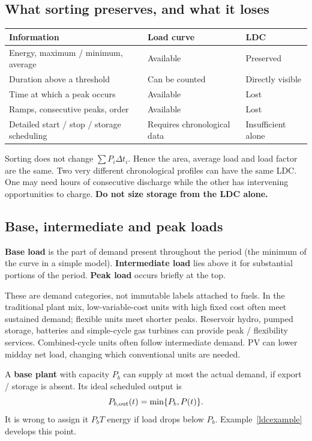 \documentclass[11pt,a4paper]{article}
\begin{document}
\subsection{What sorting preserves, and what it loses}
\begin{center}\small
\begin{tabularx}{\textwidth}{L{3.5cm}YY}
\toprule\textbf{Information} & \textbf{Load curve} & \textbf{LDC}\\\midrule
Energy, maximum / minimum, average & Available & Preserved\\
Duration above a threshold & Can be counted & Directly visible\\
Time at which a peak occurs & Available & Lost\\
Ramps, consecutive peaks, order & Available & Lost\\
Detailed start / stop / storage scheduling & Requires chronological data & Insufficient alone\\\bottomrule
\end{tabularx}\end{center}
Sorting does not change $\sum P_i\Delta t_i$. Hence the area, average load and load factor are the same. Two very different chronological profiles can have the same LDC. One may need hours of consecutive discharge while the other has intervening opportunities to charge. \textbf{Do not size storage from the LDC alone.}

\subsection{Base, intermediate and peak loads}
\textbf{Base load} is the part of demand present throughout the period (the minimum of the curve in a simple model). \textbf{Intermediate load} lies above it for substantial portions of the period. \textbf{Peak load} occurs briefly at the top.

These are demand categories, not immutable labels attached to fuels. In the traditional plant mix, low-variable-cost units with high fixed cost often meet sustained demand; flexible units meet shorter peaks. Reservoir hydro, pumped storage, batteries and simple-cycle gas turbines can provide peak / flexibility services. Combined-cycle units often follow intermediate demand. PV can lower midday net load, changing which conventional units are needed.

A \textbf{base plant} with capacity $P_b$ can supply at most the actual demand, if export / storage is absent. Its ideal scheduled output is
\[
P_{b,\rm out}(t)=\min\{P_b,P(t)\}.
\]
It is wrong to assign it $P_bT$ energy if load drops below $P_b$. Example~\ref{ldcexample} develops this point.
\end{document}

